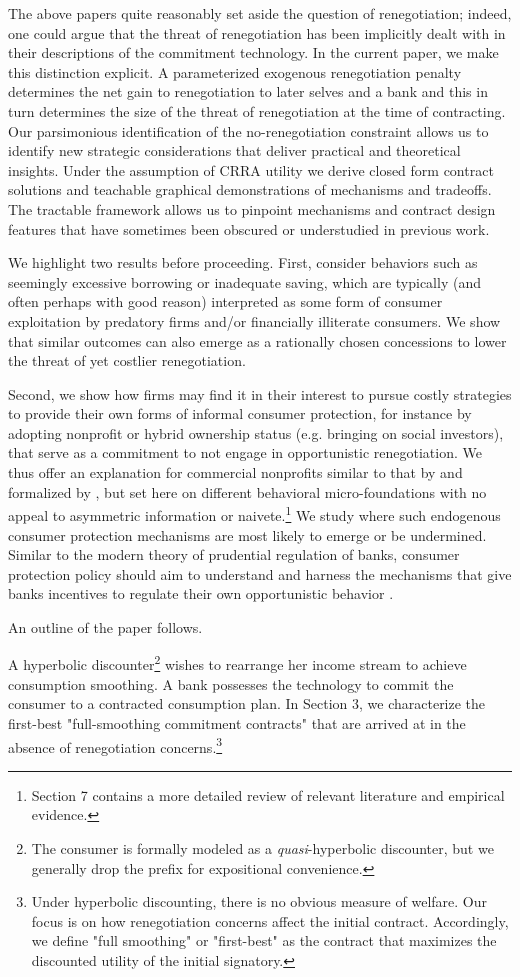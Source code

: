 \documentclass[11pt,english]{article}
\theoremstyle{plain}
\theoremstyle{definition}
\begin{document}
The above papers quite reasonably set aside the question of renegotiation; indeed, one could argue that the threat of renegotiation has been implicitly dealt with in their descriptions of the commitment technology. In the current paper, we make this distinction explicit. A parameterized exogenous renegotiation penalty
determines the net gain to renegotiation to later selves and a bank and this in turn determines the size of the threat of renegotiation at the time of contracting. Our parsimonious identification of the no-renegotiation constraint allows us to identify new strategic considerations that deliver practical and theoretical insights. Under the assumption of CRRA utility we derive closed form contract solutions and teachable graphical demonstrations of mechanisms and tradeoffs. The tractable framework allows us to pinpoint mechanisms and contract design features that have sometimes been obscured or understudied in previous work.

We highlight two results before proceeding. First, consider behaviors such as seemingly excessive borrowing or inadequate saving, which are typically (and often perhaps with good reason) interpreted as some form of consumer exploitation by predatory firms and/or financially illiterate consumers. We show that similar outcomes can also emerge as a rationally chosen concessions to lower the threat of yet costlier renegotiation. 

Second, we show how firms may find it in their interest to pursue costly strategies to provide their own forms of informal consumer protection, for instance by adopting nonprofit or hybrid ownership status (e.g. bringing on social investors), that serve as a commitment to not engage in opportunistic renegotiation. We thus offer an explanation for commercial nonprofits similar to that by \citet{hansmann1996a} and formalized by \citet{glaeser2001}, but set here on different behavioral micro-foundations with no appeal to asymmetric information or naivete.\footnote{Section 7 contains a more detailed review of relevant literature and empirical evidence.}  We study where such endogenous consumer protection mechanisms are most likely to emerge or be undermined. Similar to the modern theory of prudential regulation of banks, consumer protection policy should aim to understand and harness the mechanisms that give banks incentives to regulate their own opportunistic behavior \citep{dewatripont1999}. 

An outline of the paper follows.

A hyperbolic discounter\footnote{The consumer is formally modeled as a \emph{quasi}-hyperbolic discounter, but we generally drop the prefix for expositional convenience.} wishes to rearrange her income stream to achieve consumption smoothing. A bank possesses the technology to commit the consumer to a contracted consumption plan. In Section 3, we characterize the first-best "full-smoothing commitment contracts" that are arrived at in the absence of renegotiation concerns.\footnote{Under hyperbolic discounting, there is no obvious measure of welfare. Our focus is on how renegotiation concerns affect the initial contract. Accordingly, we define "full smoothing" or "first-best" as the contract that maximizes the discounted utility of the initial signatory.}
\end{document}
